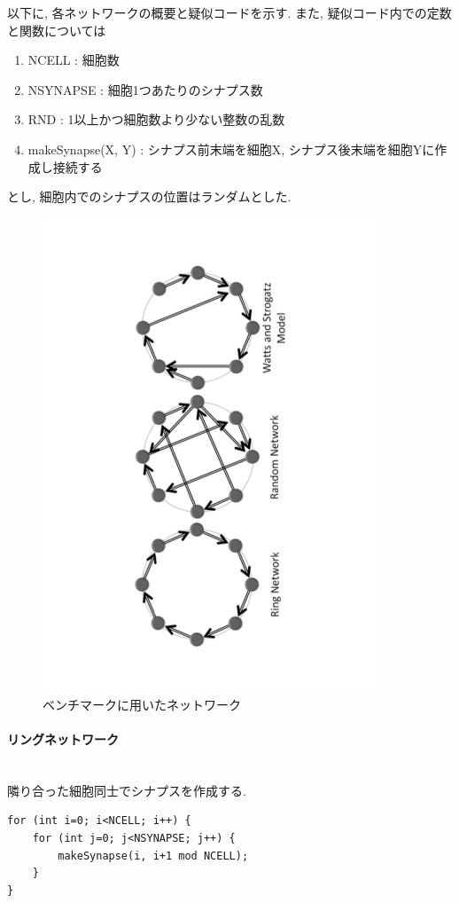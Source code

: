以下に, 各ネットワークの概要と疑似コードを示す. また, 疑似コード内での定数と関数については
\begin{enumerate}
\item NCELL : 細胞数
\item NSYNAPSE : 細胞1つあたりのシナプス数
\item RND : 1以上かつ細胞数より少ない整数の乱数
\item makeSynapse(X, Y) : シナプス前末端を細胞X, シナプス後末端を細胞Yに作成し接続する
\end{enumerate}
とし, 細胞内でのシナプスの位置はランダムとした.\\

\begin{figure}[h!]
    \includegraphics[width=10cm, angle=-90]{./images/bench.pdf}
    \caption{ベンチマークに用いたネットワーク}
    \label{fig:bench-network}
\end{figure}

\paragraph{リングネットワーク}~\\
隣り合った細胞同士でシナプスを作成する.
{\footnotesize
\begin{lstlisting}[numbers=none, caption=リングネットワークの作成]
for (int i=0; i<NCELL; i++) {
    for (int j=0; j<NSYNAPSE; j++) {
        makeSynapse(i, i+1 mod NCELL);
    }
}
\end{lstlisting}
}
